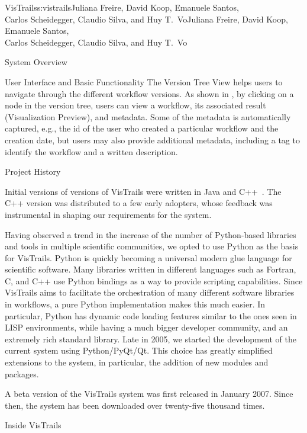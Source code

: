 \begin{aosachaptertoc}{VisTrails}{s:vistrails}{Juliana Freire, David Koop, Emanuele Santos, \\ Carlos Scheidegger, Claudio Silva, and Huy T.\ Vo}{Juliana Freire, David Koop, Emanuele Santos, \\ \hspace*{0.9cm} Carlos Scheidegger, Claudio Silva, and Huy T.\ Vo}
\begin{aosasect1}{System Overview}
\begin{aosasect2}{User Interface and Basic Functionality}
The Version Tree View helps users to navigate through the different
workflow versions. As shown in , by
clicking on a node in the version tree, users can view a workflow, its
associated result (Visualization Preview), and metadata. Some of the
metadata is automatically captured, e.g., the id of the user who
created a particular workflow and the creation date, but users may
also provide additional metadata, including a tag to identify the
workflow and a written description.


\end{aosasect2}

\end{aosasect1}

\begin{aosasect1}{Project History}

Initial versions of versions of VisTrails were written in Java and
C++~\cite{bib:bavoil:vistrails}.  The C++ version was distributed to a few early adopters, whose 
feedback was instrumental in shaping our requirements for the system.

Having observed a trend in the increase of the number of Python-based
libraries and tools in multiple scientific communities, we opted to
use Python as the basis for VisTrails. Python is quickly becoming a
universal modern glue language for scientific software. Many libraries
written in different languages such as Fortran, C, and C++ use Python
bindings as a way to provide scripting capabilities. Since VisTrails
aims to facilitate the orchestration of many different software
libraries in workflows, a pure Python implementation makes this much
easier. In particular, Python has dynamic code loading features
similar to the ones seen in LISP environments, while having a much
bigger developer community, and an extremely rich standard
library. Late in 2005, we started the development of the current
system using Python/PyQt/Qt. This choice has greatly simplified
extensions to the system, in particular, the addition of new modules
and packages.

A beta version of the VisTrails system was first released in January
2007. Since then, the system has been downloaded over twenty-five
thousand times.

\end{aosasect1}

\begin{aosasect1}{Inside VisTrails}


\end{aosasect1}
\end{aosachaptertoc}
